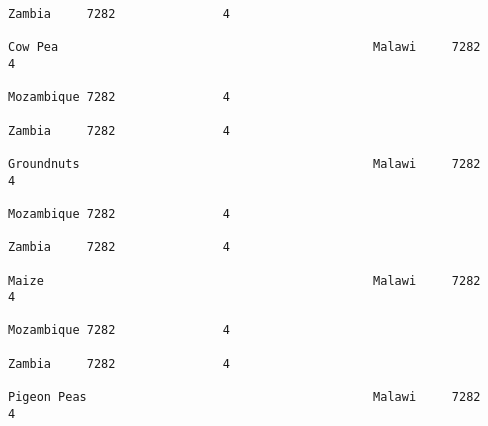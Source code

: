 \documentclass[11pt]{article}
\begin{document}
\begin{Verbatim}[commandchars=\\\{\}]
                                                                                                                                                                                                                 Zambia     7282               4  
                                                                                                                                                              Cow Pea                                            Malawi     7282               4  
                                                                                                                                                                                                                 Mozambique 7282               4  
                                                                                                                                                                                                                 Zambia     7282               4  
                                                                                                                                                              Groundnuts                                         Malawi     7282               4  
                                                                                                                                                                                                                 Mozambique 7282               4  
                                                                                                                                                                                                                 Zambia     7282               4  
                                                                                                                                                              Maize                                              Malawi     7282               4  
                                                                                                                                                                                                                 Mozambique 7282               4  
                                                                                                                                                                                                                 Zambia     7282               4  
                                                                                                                                                              Pigeon Peas                                        Malawi     7282               4  

\end{Verbatim}
\end{document}
